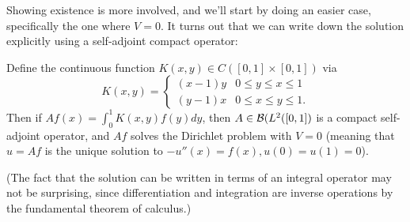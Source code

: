 Showing existence is more involved, and we'll start by doing an easier case, specifically the one where $V = 0$. It turns out that we can write down the solution explicitly using a self-adjoint compact operator:

\begin{theorem}
Define the continuous function $K(x, y) \in C([0, 1] \times [0, 1])$ via
\[
    K(x, y) = \begin{cases} (x-1)y & 0 \le y \le x \le 1 \\ (y-1)x & 0 \le x \le y \le 1. \end{cases}
\]
Then if $Af(x) = \int_0^1 K(x, y) f(y) dy$, then $A \in \mathcal{B}(L^2([0, 1])$ is a compact self-adjoint operator, and $Af$ solves the Dirichlet problem with $V = 0$ (meaning that $u = Af$ is the unique solution to $-u''(x) = f(x), u(0) = u(1) = 0$). 
\end{theorem}

(The fact that the solution can be written in terms of an integral operator may not be surprising, since differentiation and integration are inverse operations by the fundamental theorem of calculus.)

